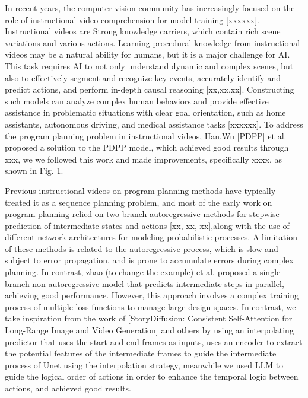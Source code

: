 \documentclass{article} %
\begin{document}
In recent years, the computer vision community has increasingly focused on the role of instructional video comprehension for model training [xxxxxx]. Instructional videos are Strong knowledge carriers, which contain rich scene variations and various actions. Learning procedural knowledge from instructional videos may be a natural ability for humans, but it is a major challenge for AI. This task requires AI to not only understand dynamic and complex scenes, but also to effectively segment and recognize key events, accurately identify and predict actions, and perform in-depth causal reasoning [xx,xx,xx]. Constructing such models can analyze complex human behaviors and provide effective assistance in problematic situations with clear goal orientation, such as home assistants, autonomous driving, and medical assistance tasks [xxxxxx]. To address the program planning problem in instructional videos, Han,Wu [PDPP] et al. proposed a solution to the PDPP model, which achieved good results through xxx, we we followed this work and made improvements, specifically xxxx, as shown in Fig. 1.

Previous instructional videos on program planning methods have typically treated it as a sequence planning problem, and most of the early work on program planning relied on two-branch autoregressive methods for stepwise prediction of intermediate states and actions [xx, xx, xx],along with the use of different network architectures for modeling probabilistic processes. A limitation of these methods is related to the autoregressive process, which is slow and subject to error propagation, and is prone to accumulate errors during complex planning. In contrast, zhao (to change the example) et al. proposed a single-branch non-autoregressive model that predicts intermediate steps in parallel, achieving good performance. However, this approach involves a complex training process of multiple loss functions to manage large design spaces. In contrast, we take inspiration from the work of [StoryDiffusion: Consistent Self-Attention for Long-Range Image and Video Generation] and others by using an interpolating predictor that uses the start and end frames as inputs, uses an encoder to extract the potential features of the intermediate frames to guide the intermediate process of Unet using the interpolation strategy, meanwhile we used LLM to guide the logical order of actions in order to enhance the temporal logic between actions, and achieved good results.
\end{document}
